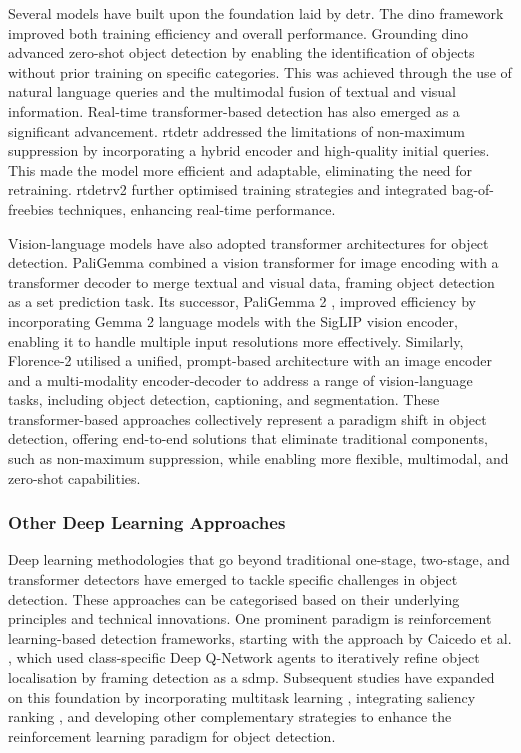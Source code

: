 Several models have built upon the foundation laid by \gls{detr}. The \gls{dino} framework \cite{zhang2022dino, li2022dn, liu2022dabdetr} improved both training efficiency and overall performance. Grounding \gls{dino} \cite{groundingdino} advanced zero-shot object detection by enabling the identification of objects without prior training on specific categories. This was achieved through the use of natural language queries and the multimodal fusion of textual and visual information.
Real-time transformer-based detection has also emerged as a significant advancement. \gls{rtdetr} \cite{rt-detr} addressed the limitations of non-maximum suppression by incorporating a hybrid encoder and high-quality initial queries. This made the model more efficient and adaptable, eliminating the need for retraining. \gls{rtdetr}v2 \cite{rt-detrv2} further optimised training strategies and integrated bag-of-freebies techniques, enhancing real-time performance.

Vision-language models have also adopted transformer architectures for object detection. PaliGemma \cite{paligemma} combined a vision transformer for image encoding with a transformer decoder to merge textual and visual data, framing object detection as a set prediction task. Its successor, PaliGemma 2 \cite{paligemma2}, improved efficiency by incorporating Gemma 2 language models with the SigLIP vision encoder, enabling it to handle multiple input resolutions more effectively. Similarly, Florence-2 \cite{florence2} utilised a unified, prompt-based architecture with an image encoder and a multi-modality encoder-decoder to address a range of vision-language tasks, including object detection, captioning, and segmentation.
These transformer-based approaches collectively represent a paradigm shift in object detection, offering end-to-end solutions that eliminate traditional components, such as non-maximum suppression, while enabling more flexible, multimodal, and zero-shot capabilities.

\subsubsection{Other Deep Learning Approaches}
\label{subsubsec:2_other_approaches}

Deep learning methodologies that go beyond traditional one-stage, two-stage, and transformer detectors have emerged to tackle specific challenges in object detection. These approaches can be categorised based on their underlying principles and technical innovations.
One prominent paradigm is reinforcement learning-based detection frameworks, starting with the approach by Caicedo et al. \cite{Caicedo_2015_ICCV}, which used class-specific Deep Q-Network agents to iteratively refine object localisation by framing detection as a \gls{sdmp}. Subsequent studies have expanded on this foundation by incorporating multitask learning \cite{multitask_learning}, integrating saliency ranking \cite{bartolo2024integratingsaliencyrankingreinforcement}, and developing other complementary strategies \cite{reinforcenet, bar_rl} to enhance the reinforcement learning paradigm for object detection.

